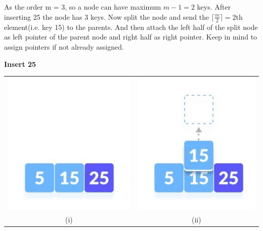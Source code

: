 \documentclass{article}
\begin{document}
        \subsection*{}
        As the order m = 3, so a node can have maximum $ m-1 = 2 $ keys. After inserting 25 the node has 3 keys. Now split the node and send the $\lceil \frac{m}{2}\rceil = 2$th element(i.e. key 15)  to the parents. And then attach the left half of the split node as left pointer of the parent node and right half as right pointer. Keep in mind to assign pointers if not already assigned.
        \begin{center}
            \color{red}\textbf{Insert 25}  
        \end{center}
        \begin{table}[ht]
            \centering
            \begin{tabular}{c c}
                    \includegraphics[scale=0.9]{Images/bi3_1_1.jpg} &\includegraphics[scale=0.9]{Images/bi3_1_2.jpg}\\
                ({\color{red}i}) &({\color{red}ii}) \\

\end{tabular}
\end{table}
\end{document}

